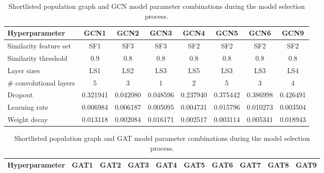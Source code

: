 \begin{sidewaystable}
    \caption{Shortlisted population graph and GCN model parameter combinations during the model selection process.}
    \centering
    \small
    \begin{tabular}{lccccccc}
        \hline
    \textbf{Hyperparameter} & \textbf{GCN1} & \textbf{GCN2} & \textbf{GCN3} & \textbf{GCN4} & \textbf{GCN5} & \textbf{GCN6} & \textbf{GCN9} \\  \hline
        Similarity feature set &  SF1 & SF3 & SF3 & SF2 & SF2 & SF2 & SF2 \\
        Similarity threshold & 0.9 & 0.8 & 0.8 & 0.8 & 0.8 & 0.8 & 0.8\\ \hline
        Layer sizes & LS1 &  LS2 & LS3 & LS5 & LS3 & LS3 & LS4 \\ 
        \# convolutional layers & 5 & 3& 1& 2& 5& 3& 4\\ 
        Dropout &  0.321941 & 0.042080& 0.048596& 0.237940& 0.375442& 0.386998& 0.426491\\ 
        Learning rate & 0.006984& 0.006187& 0.005095& 0.004731& 0.015796& 0.010273& 0.003504\\ 
        Weight decay & 0.013118& 0.002084& 0.016171& 0.002517& 0.003114& 0.005341& 0.018943\\ \hline
\end{tabular}
    \end{sidewaystable}


\begin{sidewaystable}
    \caption{Shortlisted population graph and GAT model parameter combinations during the model selection process.}
    \centering
    \small
    \begin{tabular}{lccccccccc}
        \hline
    \textbf{Hyperparameter} & \textbf{GAT1} & \textbf{GAT2} & \textbf{GAT3} & \textbf{GAT4} & \textbf{GAT5} & \textbf{GAT6} & \textbf{GAT7} & \textbf{GAT8} & \textbf{GAT9} \\  \hline
\end{tabular}
    \end{sidewaystable}